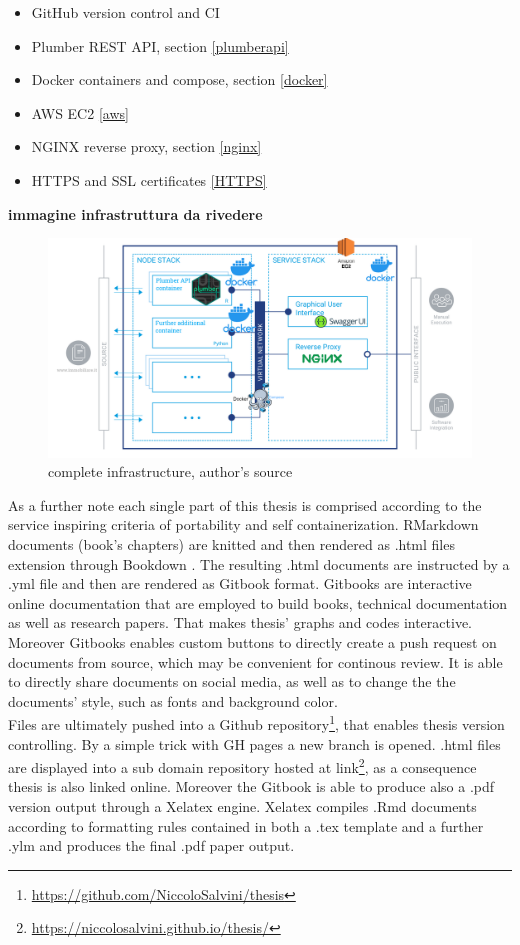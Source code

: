 \documentclass[
  12pt,
  a4paper,
  oneside]{book}
\DeclareRobustCommand{\href}[2]{#2\footnote{\url{#1}}}
\providecommand{\tightlist}{%
  \setlength{\itemsep}{0pt}\setlength{\parskip}{0pt}}
\theoremstyle{definition}
\theoremstyle{definition}
\theoremstyle{definition}
\theoremstyle{remark}
\begin{document}
\begin{itemize}
\tightlist
\item
  GitHub version control and CI
\item
  Plumber REST API, section \ref{plumberapi}
\item
  Docker containers and compose, section \ref{docker}
\item
  AWS EC2 \ref{aws}
\item
  NGINX reverse proxy, section \ref{nginx}
\item
  HTTPS and SSL certificates \ref{HTTPS}
\end{itemize}

\textbf{immagine infrastruttura da rivedere}

\begin{figure}
\centering
\includegraphics{images/software_arch.jpg.png}
\caption{\label{fig:CompleteStructure}complete infrastructure, author's source}
\end{figure}

As a further note each single part of this thesis is comprised according to the service inspiring criteria of portability and self containerization. RMarkdown \citep{rmarkdown1} documents (book's chapters) are knitted and then rendered as .html files extension through Bookdown \citep{bookdown2}. The resulting .html documents are instructed by a .yml file and then are rendered as Gitbook format. Gitbooks are interactive online documentation that are employed to build books, technical documentation as well as research papers. That makes thesis' graphs and codes interactive. Moreover Gitbooks enables custom buttons to directly create a push request on documents from source, which may be convenient for continous review. It is able to directly share documents on social media, as well as to change the the documents' style, such as fonts and background color.\\
Files are ultimately pushed into a \href{https://github.com/NiccoloSalvini/thesis}{Github repository}, that enables thesis version controlling. By a simple trick with GH pages a new branch is opened. .html files are displayed into a sub domain repository hosted at \href{https://niccolosalvini.github.io/thesis/}{link}, as a consequence thesis is also linked online. Moreover the Gitbook is able to produce also a .pdf version output through a Xelatex engine. Xelatex compiles .Rmd documents according to formatting rules contained in both a .tex template and a further .ylm and produces the final .pdf paper output.
\end{document}
